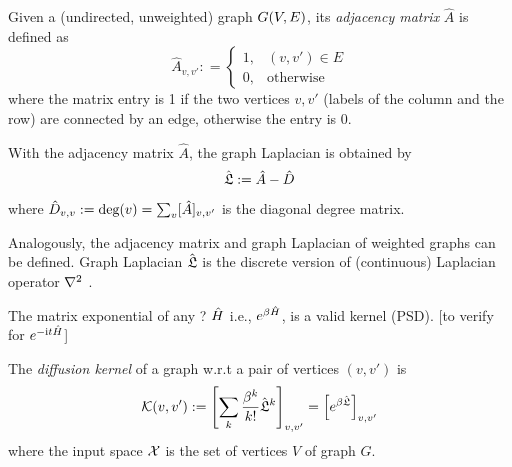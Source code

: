 \begin{definition}\label{def:adjacency_matrix}
	Given a (undirected, unweighted) graph $G(V,E)$, its \emph{adjacency matrix} $\hat{A}$ is defined as
	\begin{equation}
		\hat{A}_{v,v'} : = 
		\begin{cases}
			1, & (v,v') \in E \\
			0, & \text{otherwise}
		\end{cases}
	\end{equation}
	where the matrix entry is 1 if the two vertices $v,v'$ (labels of the column and the row) are connected by an edge, otherwise the entry is 0.
\end{definition}
\begin{definition}\label{def:graph_laplacian}
	With the adjacency matrix $\hat{A}$, the graph Laplacian is obtained by
	\begin{equation}
		\hat{\mathfrak{L}}:=\hat{A}-\hat{D}	
	\end{equation}
	where $\hat{D}_{v,v}:=\textup{deg}(v)=\sum_{v}[\hat{A}]_{v,v'}$ is the diagonal degree matrix.
\end{definition}
	Analogously, the adjacency matrix and graph Laplacian of weighted graphs can be defined.
	Graph Laplacian $\hat{\mathfrak{L}}$ is the 
	discrete version of (continuous) Laplacian operator $\laplacian$
	\cite{chungSpectralGraphTheory1997}.
\begin{observation}
	The matrix exponential of any ? $\hat{H}$ i.e., $e^{\beta \hat{H}}$, is a valid kernel (PSD). [to verify for $e^{-\textup{i} t\hat{H}}$]
\end{observation}
\begin{definition}\label{def:diffusion_kernel}
	The \emph{diffusion kernel} of a graph w.r.t a pair of vertices $(v,v')$ is
	\begin{equation}
		\mathcal{K}(v,v') := 
		\qty[\sum_{k}\frac{\beta^k}{k!}\hat{\mathfrak{L}}^k]_{v,v'}  =
		\qty[e^{\beta \hat{\mathfrak{L}}}]_{v,v'} 
	\end{equation}
	where the input space $\mathcal{X}$ is the set of vertices $V$ of graph $G$.
\end{definition}

